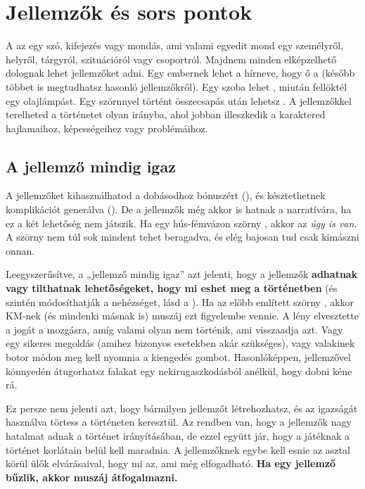 \chapter{Jellemzők és sors pontok}

A  az egy szó, kifejezés vagy mondás, ami valami egyedit mond egy személyről, helyről, tárgyról, szituációról vagy csoportról. Majdnem minden elképzelhető dolognak lehet jellemzőket adni. Egy embernek lehet a hírneve, hogy ő a  (később többet is megtudhatsz hasonló jellemzőkről). Egy szoba lehet , miután fellöktél egy olajlámpást. Egy szörnnyel történt összecsapás után lehetsz . A jellemzőkkel terelheted a történetet olyan irányba, ahol jobban illeszkedik a karaktered hajlamaihoz, képességeihez vagy problémáihoz.

\section{A jellemző mindig igaz}

A jellemzőket kihasználhatod a dobásodhoz bónuszért (), és késztethetnek komplikációt generálva (). De a jellemzők még akkor is hatnak a narratívára, ha ez a két lehetőség nem játszik. Ha egy hús‑fémvázon szörny , akkor az \emph{úgy is van}. A szörny nem túl sok mindent tehet beragadva, és elég bajosan tud csak kimászni onnan.

Leegyszerűsítve, a „jellemző mindig igaz” azt jelenti, hogy a jellemzők \textbf{adhatnak vagy tilthatnak lehetőségeket, hogy mi eshet meg a történetben} (és szintén módosíthatják a nehézséget, lásd a ). Ha az előbb említett szörny , akkor KM‑nek (és mindenki másnak is) muszáj ezt figyelembe vennie. A lény elvesztette a jogát a mozgásra, amíg valami olyan nem történik, ami visszaadja azt. Vagy egy sikeres megoldás (amihez bizonyos esetekben akár  szükséges), vagy valakinek botor módon meg kell nyomnia a kiengedés gombot. Hasonlóképpen,  jellemzővel könnyedén átugorhatsz falakat egy nekirugaszkodásból anélkül, hogy dobni kéne rá.

Ez persze nem jelenti azt, hogy bármilyen jellemzőt létrehozhatsz, és az igazságát használva törtess a történeten keresztül. Az rendben van, hogy a jellemzők nagy hatalmat adnak a történet irányításában, de ezzel együtt jár, hogy a játéknak a történet korlátain belül kell maradnia. A jellemzőknek egybe kell esnie az asztal körül ülők elvárásaival, hogy mi az, ami még elfogadható. \textbf{Ha egy jellemző bűzlik, akkor muszáj átfogalmazni.}

